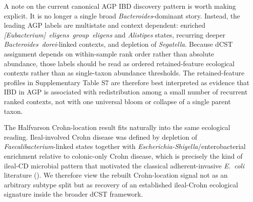 \documentclass[
  11pt,
]{article}
\newcommand{\taxon}[1]{\emph{#1}}
\begin{document}
A note on the current canonical AGP IBD discovery pattern is worth
making explicit. It is no longer a single broad
\taxon{Bacteroides}-dominant story. Instead, the leading AGP labels are
multistate and context dependent: enriched
\taxon{[Eubacterium]~eligens~group~eligens} and \taxon{Alistipes}
states, recurring deeper \taxon{Bacteroides~dorei}-linked contexts, and
depletion of \taxon{Segatella}. Because dCST assignment depends on
within-sample rank order rather than absolute abundance, those labels
should be read as ordered retained-feature ecological contexts rather
than as single-taxon abundance thresholds. The retained-feature profiles
in Supplementary Table S7 are therefore best interpreted as evidence
that IBD in AGP is associated with redistribution among a small number
of recurrent ranked contexts, not with one universal bloom or collapse
of a single parent taxon.

The Halfvarson Crohn-location result fits naturally into the same
ecological reading. Ileal-involved Crohn disease was defined by
depletion of \taxon{Faecalibacterium}-linked states together with
\taxon{Escherichia-Shigella}/enterobacterial enrichment relative to
colonic-only Crohn disease, which is precisely the kind of ileal-CD
microbial pattern that motivated the classical adherent-invasive
\emph{E.~coli} literature
(). We therefore view the rebuilt Crohn-location signal not
as an arbitrary subtype split but as recovery of an established
ileal-Crohn ecological signature inside the broader dCST framework.
\end{document}
